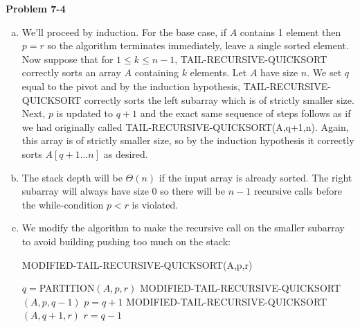 \documentclass{article}
\begin{document}
\noindent\textbf{Problem 7-4}\\

\begin{enumerate}[a.]
\item We'll proceed by induction.  For the base case, if $A$ contains 1 element then $p = r$ so the algorithm terminates immediately, leave a single sorted element.  Now suppose that for $1 \leq k \leq n-1$, TAIL-RECURSIVE-QUICKSORT correctly sorts an array $A$ containing $k$ elements. Let $A$ have size $n$.  We set $q$ equal to the pivot and by the induction hypothesis, TAIL-RECURSIVE-QUICKSORT correctly sorts the left subarray which is of strictly smaller size.  Next, $p$ is updated to $q+1$ and the exact same sequence of steps follows as if we had originally called TAIL-RECURSIVE-QUICKSORT(A,q+1,n).  Again, this array is of strictly smaller size, so by the induction hypothesis it correctly sorts $A[q+1...n]$ as desired. \\

\item The stack depth will be $\Theta(n)$ if the input array is already sorted. The right subarray will always have size 0 so there will be $n-1$ recursive calls before the while-condition $p<r$ is violated. \\

\item We modify the algorithm to make the recursive call on the smaller subarray to avoid building pushing too much on the stack:

\begin{algorithm}
\caption{MODIFIED-TAIL-RECURSIVE-QUICKSORT(A,p,r)}
\begin{algorithmic}[1]
	\State $q = $PARTITION$(A,p,r)$
		\State MODIFIED-TAIL-RECURSIVE-QUICKSORT$(A,p,q-1)$
		\State $p = q+1$
	\Else
		\State MODIFIED-TAIL-RECURSIVE-QUICKSORT$(A,q+1,r)$
		\State $r = q-1$
	\EndIf
\EndWhile
\end{algorithmic}
\end{algorithm}
\end{enumerate}
\end{document}
